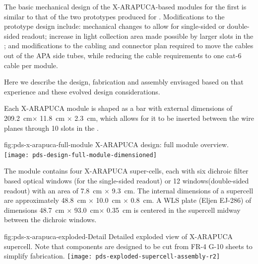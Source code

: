 
The basic mechanical design of the X-ARAPUCA-based  modules for the first  is similar to that of the two prototypes produced for . Modifications to the prototype design include:  mechanical changes to allow for single-sided or double-sided readout; increase in light collection area made possible by larger slots in the ; and modifications to the cabling and connector plan required to move the  cables out of the APA side tubes, while reducing the cable requirements to one cat-6 cable per  module.

Here we describe the design, fabrication and assembly envisaged based on that experience and these evolved design considerations.

Each X-ARAPUCA module is shaped as a bar with external dimensions of \SI{209.2}{cm}$ \times$ \SI{11.8}{cm} $\times$ \SI{2.3}{cm}, which allows for it to be inserted between the wire planes through 10 slots in the . 


\begin{dunefigure}
{fig:pds-x-arapuca-full-module}
{X-ARAPUCA design: full module overview.}
   \texttt{[image: pds-design-full-module-dimensioned]}
\end{dunefigure}

The module contains four X-ARAPUCA super-cells, each with six dichroic filter based optical windows (for the single-sided readout) or 12 windows(double-sided readout) with an area of \SI{7.8}{cm} $\times$ \SI{9.3}{cm}.  The internal dimensions of  a supercell are approximately \SI{48.8}{cm} $\times$ \SI{10.0}{cm} $\times$ \SI{0.8}{cm}. A WLS plate (Eljen EJ-286) of dimensions \SI{48.7}{cm} $\times$ \SI{93.0}{cm}$\times$ \SI{0.35}{cm} is centered in the supercell midway between the dichroic windows.  
 

\begin{dunefigure}{fig:pds-x-arapuca-exploded-Detail}
{Detailed exploded view of X-ARAPUCA supercell. Note that components are designed to be cut from FR-4 G-10 sheets to simplify fabrication.}
   \texttt{[image: pds-exploded-supercell-assembly-r2]}
\end{dunefigure}

